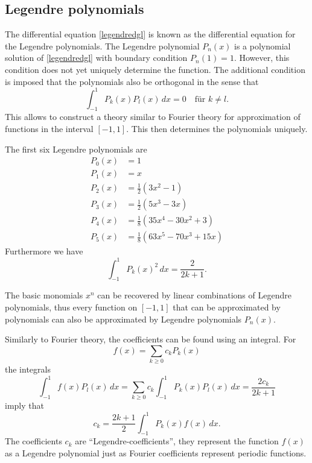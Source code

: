 \subsection{Legendre polynomials}
The differential equation \eqref{legendredgl} is known as the differential
equation for the Legendre polynomials.
The Legendre polynomial $P_n(x)$ is a polynomial solution of
\eqref{legendredgl} with boundary condition $P_n(1)=1$.
However, this condition does not yet uniquely determine the function.
The additional condition is imposed that the polynomials also be
orthogonal in the sense that
\[
\int_{-1}^1 P_k(x)P_l(x)\,dx=0\quad\text{für $k\ne l$}.
\]
This allows to construct a theory similar to Fourier theory for
approximation of functions in the interval $[-1,1]$.
This then determines the polynomials uniquely.

The first six Legendre polynomials are
\begin{align*}
P_0(x)&=1\\
P_1(x)&=x\\
P_2(x)&=\frac12(3x^2-1)\\
P_3(x)&=\frac12(5x^3-3x)\\
P_4(x)&=\frac18(35x^4-30x^2+3)\\
P_5(x)&=\frac18(63x^5-70x^3+15x)
\end{align*}
Furthermore we have
\[
\int_{-1}^1 P_k(x)^2\,dx = \frac{2}{2k+1}.
\]

The basic monomials $x^n$ can be recovered by linear combinations of Legendre
polynomials, thus every function on $[-1,1]$ that can be approximated by
polynomials can also be approximated by Legendre polynomials $P_n(x)$.

Similarly to Fourier theory, the coefficients can be found using an
integral.
For
\[
f(x)=\sum_{k\ge 0} c_k P_k(x)
\]
the integrals
\[
\int_{-1}^1 f(x)P_l(x)\,dx
=
\sum_{k\ge 0} c_k \int_{-1}^1 P_k(x)P_l(x)\,dx
=
\frac{2c_k}{2k+1}
\]
imply that
\[
c_k=\frac{2k+1}{2}\int_{-1}^1P_k(x)f(x)\,dx.
\]
The coefficients $c_k$ are ``Legendre-coefficients'', they represent
the function $f(x)$ as a Legendre polynomial just as Fourier coefficients
represent periodic functions.

